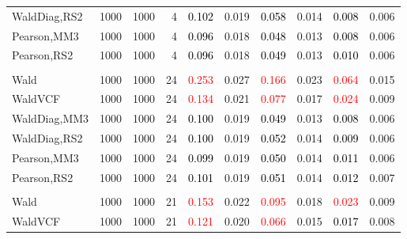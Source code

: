 \documentclass[
]{article}
\begin{document}
\begin{table}[H]
{\begin{tabular}[t]{lrrrrrrlrr}
\hspace{1em}WaldDiag,RS2 & 1000 & 1000 & 4 & \textcolor{black}{0.102} & 0.019 & \textcolor{black}{0.058} & 0.014 & \textcolor{black}{0.008} & 0.006\\
\hspace{1em}Pearson,MM3 & 1000 & 1000 & 4 & \textcolor{black}{0.096} & 0.018 & \textcolor{black}{0.048} & 0.013 & \textcolor{black}{0.008} & 0.006\\
\hspace{1em}Pearson,RS2 & 1000 & 1000 & 4 & \textcolor{black}{0.096} & 0.018 & \textcolor{black}{0.049} & 0.013 & \textcolor{black}{0.010} & 0.006\\
\addlinespace[0.3em]
\multicolumn{10}{l}{\textbf{1F 15V}}\\
\hspace{1em}Wald & 1000 & 1000 & 24 & \textcolor{red}{0.253} & 0.027 & \textcolor{red}{0.166} & 0.023 & \textcolor{red}{0.064} & 0.015\\
\hspace{1em}WaldVCF & 1000 & 1000 & 24 & \textcolor{red}{0.134} & 0.021 & \textcolor{red}{0.077} & 0.017 & \textcolor{red}{0.024} & 0.009\\
\hspace{1em}WaldDiag,MM3 & 1000 & 1000 & 24 & \textcolor{black}{0.100} & 0.019 & \textcolor{black}{0.049} & 0.013 & \textcolor{black}{0.008} & 0.006\\
\hspace{1em}WaldDiag,RS2 & 1000 & 1000 & 24 & \textcolor{black}{0.100} & 0.019 & \textcolor{black}{0.052} & 0.014 & \textcolor{black}{0.009} & 0.006\\
\hspace{1em}Pearson,MM3 & 1000 & 1000 & 24 & \textcolor{black}{0.099} & 0.019 & \textcolor{black}{0.050} & 0.014 & \textcolor{black}{0.011} & 0.006\\
\hspace{1em}Pearson,RS2 & 1000 & 1000 & 24 & \textcolor{black}{0.101} & 0.019 & \textcolor{black}{0.051} & 0.014 & \textcolor{black}{0.012} & 0.007\\
\addlinespace[0.3em]
\multicolumn{10}{l}{\textbf{2F 10V}}\\
\hspace{1em}Wald & 1000 & 1000 & 21 & \textcolor{red}{0.153} & 0.022 & \textcolor{red}{0.095} & 0.018 & \textcolor{red}{0.023} & 0.009\\
\hspace{1em}WaldVCF & 1000 & 1000 & 21 & \textcolor{red}{0.121} & 0.020 & \textcolor{red}{0.066} & 0.015 & \textcolor{black}{0.017} & 0.008\\

\end{tabular}}
\end{table}
\end{document}
